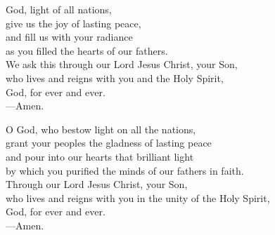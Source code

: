 \prayer

\begin{prayerverse}

God, light of all nations,\\
give us the joy of lasting peace,\\
and fill us with your radiance\\
as you filled the hearts of our fathers.\\
We ask this through our Lord Jesus Christ, your Son,\\
who lives and reigns with you and the Holy Spirit,\\
God, for ever and ever.\\
{\color{red}---\thinspace}Amen.

\end{prayerverse}


\begin{prayerverse}

O God, who bestow light on all the nations,\\
grant your peoples the gladness of lasting peace\\
and pour into our hearts that brilliant light\\
by which you purified the minds of our fathers in faith.\\
Through our Lord Jesus Christ, your Son,\\
who lives and reigns with you in the unity of the Holy Spirit,\\
God, for ever and ever.\\
{\color{red}---\thinspace}Amen.

\end{prayerverse}